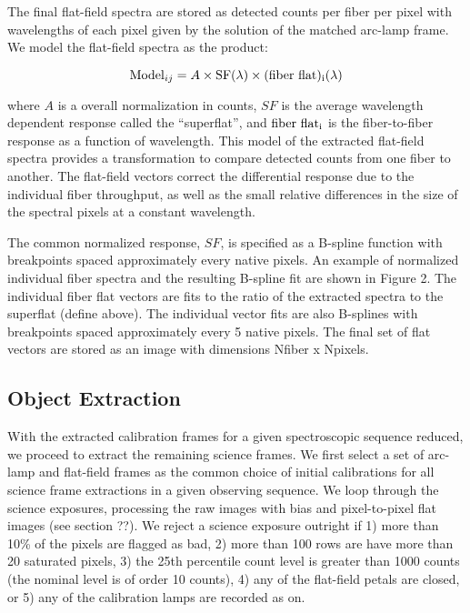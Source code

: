 \documentclass[12pt,preprint]{aastex}
\begin{document}
The final flat-field spectra are stored as 
detected counts per fiber per pixel with wavelengths of each pixel
given by the solution of the matched arc-lamp frame.  
We model the flat-field spectra as the product:


\begin{equation} 
{\rm Model}_{ij} = A \times {\rm SF}(\lambda) \times {\rm (fiber~flat)_i} (\lambda) 
\end{equation} 

where $A$ is a overall normalization in counts, 
$SF$ is the average wavelength dependent response called the ``superflat'', and
${\rm fiber~flat_i}$ is the fiber-to-fiber response as a function of wavelength.
This model of the extracted flat-field spectra provides a transformation to
compare detected counts from one fiber to another.
The flat-field vectors correct the differential response due to the individual fiber
throughput, as well as the small relative differences in the size of the
spectral pixels at a constant wavelength.  

The common normalized response, $SF$, is specified as a B-spline
function with breakpoints spaced approximately every native pixels.
An example of normalized individual fiber spectra 
and the resulting B-spline fit are shown in Figure 2.  The individual fiber
flat vectors are fits to the ratio of the extracted spectra to the superflat
(define above).  The individual vector fits are also B-splines with breakpoints
spaced approximately every 5 native pixels.  The final set of flat vectors are
stored as an image with dimensions Nfiber x Npixels.


\subsection{Object Extraction}

With the extracted calibration frames for a given spectroscopic sequence
reduced, we proceed to extract the remaining science frames.
We first select a set of arc-lamp and flat-field frames as the common
choice of initial calibrations for all science frame extractions in a given
observing sequence.  We loop through the science exposures, processing the
raw images with bias and pixel-to-pixel flat images (see section ??).
We reject a science exposure outright if 1) more than 10\% of the pixels
are flagged as bad, 2) more than 100 rows are have more than 20 saturated
pixels, 3) the 25th
percentile count level is greater than 1000 counts (the nominal level
is of order 10 counts), 4) any of the flat-field petals are closed, or 5)
any of the calibration lamps are recorded as on.
\end{document}
